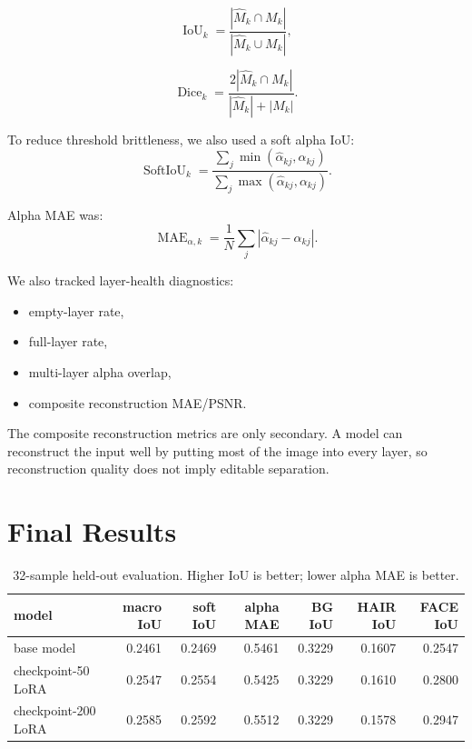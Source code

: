 \documentclass[11pt]{article}
\begin{document}
\begin{equation}
\operatorname{IoU}_k
=
\frac{
|\hat{M}_k\cap M_k|
}{
|\hat{M}_k\cup M_k|
},
\end{equation}

\begin{equation}
\operatorname{Dice}_k
=
\frac{
2|\hat{M}_k\cap M_k|
}{
|\hat{M}_k|+|M_k|
}.
\end{equation}

To reduce threshold brittleness, we also used a soft alpha IoU:
\begin{equation}
\operatorname{SoftIoU}_k
=
\frac{
\sum_j \min(\hat{\alpha}_{kj},\alpha_{kj})
}{
\sum_j \max(\hat{\alpha}_{kj},\alpha_{kj})
}.
\end{equation}

Alpha MAE was:
\begin{equation}
\operatorname{MAE}_{\alpha,k}
=
\frac{1}{N}
\sum_j
|\hat{\alpha}_{kj}-\alpha_{kj}|.
\end{equation}

We also tracked layer-health diagnostics:

\begin{itemize}[leftmargin=*]
    \item empty-layer rate,
    \item full-layer rate,
    \item multi-layer alpha overlap,
    \item composite reconstruction MAE/PSNR.
\end{itemize}

The composite reconstruction metrics are only secondary. A model can reconstruct
the input well by putting most of the image into every layer, so reconstruction
quality does not imply editable separation.

\section{Final Results}

\begin{table}[h]
\centering
\caption{32-sample held-out evaluation. Higher IoU is better; lower alpha MAE is better.}
\begin{tabular}{lrrrrrr}
\toprule
model & macro IoU & soft IoU & alpha MAE & BG IoU & HAIR IoU & FACE IoU \\
\midrule
base model & 0.2461 & 0.2469 & 0.5461 & 0.3229 & 0.1607 & 0.2547 \\
checkpoint-50 LoRA & 0.2547 & 0.2554 & 0.5425 & 0.3229 & 0.1610 & 0.2800 \\
checkpoint-200 LoRA & 0.2585 & 0.2592 & 0.5512 & 0.3229 & 0.1578 & 0.2947 \\
\bottomrule
\end{tabular}
\end{table}
\end{document}
